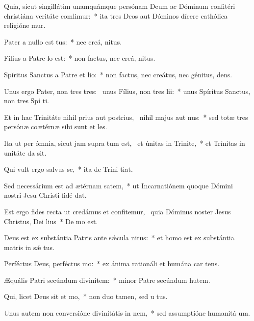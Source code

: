\item Quia, sicut singillátim unamquámque persónam Deum ac Dóminum confitéri christiána veritáte comlimur:~* ita tres Deos aut Dóminos dícere cathólica religióne mur.
\item Pater a nullo est tus:~* nec creá,  nitus.
\item Fílius a Patre lo est:~* non factus, nec creá,  nitus.
\item Spíritus Sanctus a Patre et lio:~* non factus, nec creátus, nec génitus,  dens.
\item Unus ergo Pater, non tres tres:~\pscross{} unus Fílius, non tres lii:~* unus Spíritus Sanctus, non tres Spí ti.
\item Et in hac Trinitáte nihil prius aut postrius,~\pscross{} nihil majus aut nus:~* sed totæ tres persónæ coætérnæ sibi sunt et les.
\item Ita ut per ómnia, sicut jam supra tum est,~\pscross{} et únitas in Trinite,~* et Trínitas in unitáte da sit.
\item Qui vult ergo salvus se,~* ita de Trini tiat.
\item Sed necessárium est ad ætérnam satem,~* ut Incarnatiónem quoque Dómini nostri Jesu Christi fidé dat.
\item Est ergo fides recta ut credámus et confitemur,~\pscross{} quia Dóminus noster Jesus Christus, Dei lius~* De  mo est.
\item Deus est ex substántia Patris ante sǽcula nitus:~* et homo est ex substántia matris in sǽ tus.
\item Perféctus Deus, perféctus mo:~* ex ánima rationáli et humána car tens.
\item Æquális Patri secúndum divinitem:~* minor Patre secúndum hutem.
\item Qui, licet Deus sit et mo,~* non duo tamen, sed u  tus.
\item Unus autem non conversióne divinitátis in nem,~* sed assumptióne humanitá  um.
